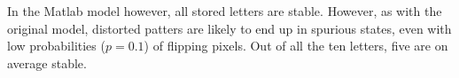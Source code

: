 \documentclass[a4paper,12pt]{article}
\theoremstyle{plain}
\theoremstyle{definition}
\begin{document}
      In the Matlab model however, all stored letters are stable. However, as
      with the original model, distorted patters are likely to end up in
      spurious states, even with low probabilities ($p = 0.1$) of flipping pixels. Out
      of all the ten letters, five are on average stable. 
      




      

      
\end{document}
